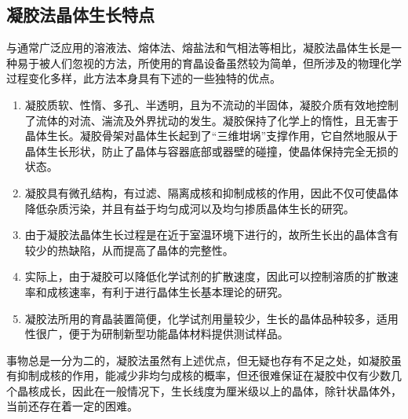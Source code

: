 \subsection{凝胶法晶体生长特点}
与通常广泛应用的溶液法、熔体法、熔盐法和气相法等相比，凝胶法晶体生长是一种易于被人们忽视的方法，所使用的育晶设备虽然较为简单，但所涉及的物理化学过程变化多样，此方法本身具有下述的一些独特的优点。

\begin{enumerate}[(1)]\itemsep -0.5ex
\item 凝胶质软、性惰、多孔、半透明，且为不流动的半固体，凝胶介质有效地控制了流体的对流、湍流及外界扰动的发生。凝胶保持了化学上的惰性，且无害于晶体生长。凝胶骨架对晶体生长起到了“三维坩埚”支撑作用，它自然地服从于晶体生长形状，防止了晶体与容器底部或器壁的碰撞，使晶体保持完全无损的状态。
\item 凝胶具有微孔结构，有过滤、隔离成核和抑制成核的作用，因此不仅可使晶体降低杂质污染，并且有益于均匀成河以及均匀掺质晶体生长的研究。
\item 由于凝胶法晶体生长过程是在近于室温环境下进行的，故所生长出的晶体含有较少的热缺陷，从而提高了晶体的完整性。
\item 实际上，由于凝胶可以降低化学试剂的扩散速度，因此可以控制溶质的扩散速率和成核速率，有利于进行晶体生长基本理论的研究。
\item 凝胶法所用的育晶装置简便，化学试剂用量较少，生长的晶体品种较多，适用性很广，便于为研制新型功能晶体材料提供测试样品。
\end{enumerate}

事物总是一分为二的，凝胶法虽然有上述优点，但无疑也存有不足之处，如凝胶虽有抑制成核的作用，能减少非均匀成核的概率，但还很难保证在凝胶中仅有少数几个晶核成长，因此在一般情况下，生长线度为厘米级以上的晶体，除针状晶体外，当前还存在着一定的困难。
